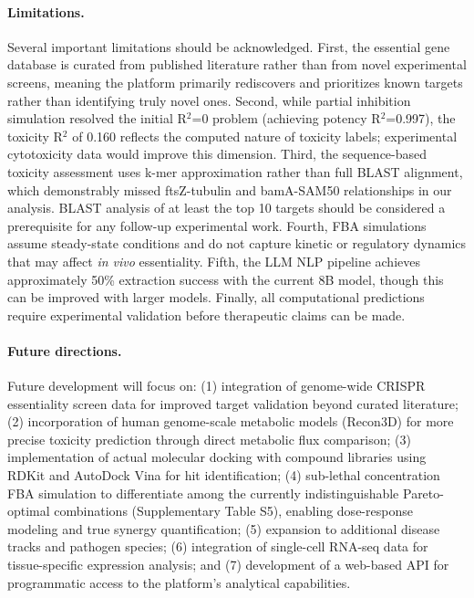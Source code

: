 \documentclass[12pt,a4paper]{article}
\begin{document}
\paragraph{Limitations.}
Several important limitations should be acknowledged. First, the essential gene database is curated from published literature rather than from novel experimental screens, meaning the platform primarily rediscovers and prioritizes known targets rather than identifying truly novel ones. Second, while partial inhibition simulation resolved the initial R$^2$=0 problem (achieving potency R$^2$=0.997), the toxicity R$^2$ of 0.160 reflects the computed nature of toxicity labels; experimental cytotoxicity data would improve this dimension. Third, the sequence-based toxicity assessment uses k-mer approximation rather than full BLAST alignment, which demonstrably missed ftsZ-tubulin and bamA-SAM50 relationships in our analysis. BLAST analysis of at least the top 10 targets should be considered a prerequisite for any follow-up experimental work. Fourth, FBA simulations assume steady-state conditions and do not capture kinetic or regulatory dynamics that may affect \textit{in vivo} essentiality. Fifth, the LLM NLP pipeline achieves approximately 50\% extraction success with the current 8B model, though this can be improved with larger models. Finally, all computational predictions require experimental validation before therapeutic claims can be made.

\paragraph{Future directions.}
Future development will focus on: (1) integration of genome-wide CRISPR essentiality screen data for improved target validation beyond curated literature; (2) incorporation of human genome-scale metabolic models (Recon3D) for more precise toxicity prediction through direct metabolic flux comparison; (3) implementation of actual molecular docking with compound libraries using RDKit and AutoDock Vina for hit identification; (4) sub-lethal concentration FBA simulation to differentiate among the currently indistinguishable Pareto-optimal combinations (Supplementary Table S5), enabling dose-response modeling and true synergy quantification; (5) expansion to additional disease tracks and pathogen species; (6) integration of single-cell RNA-seq data for tissue-specific expression analysis; and (7) development of a web-based API for programmatic access to the platform's analytical capabilities.
\end{document}
